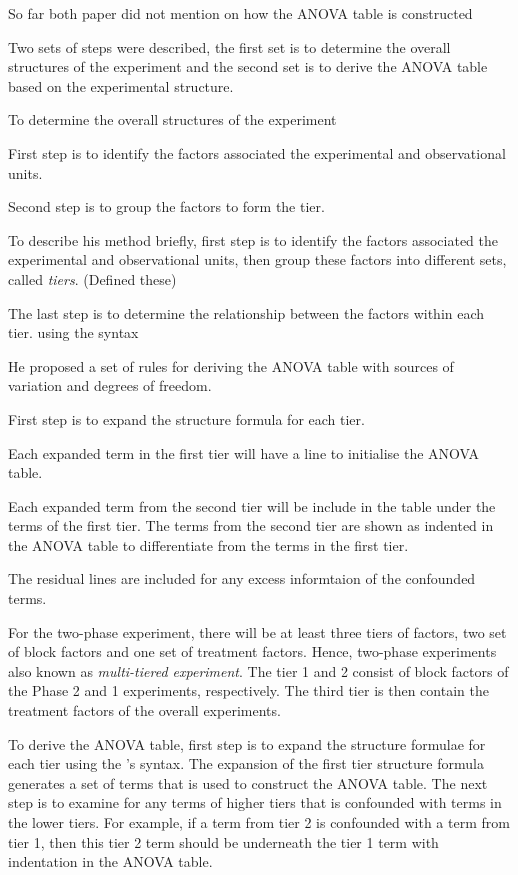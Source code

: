 \documentclass[11pt,a4paper]{article}
\begin{document}
So far both paper did not mention on how the ANOVA table is constructed 


Two sets of steps were described, the first set is to determine the overall structures of the experiment and the second set is to derive the ANOVA table based on the experimental structure.

To determine the overall structures of the experiment

First step is to identify the factors associated the experimental and observational units.

Second step is to group the factors to form the tier. 


To describe his method briefly, first step is to identify the factors associated the experimental and observational units, then group these factors into different sets, called \emph{tiers}. (Defined these)


The last step is to determine the relationship between the factors within each tier. using the syntax



He proposed a set of rules for deriving the ANOVA table with sources of variation and degrees of freedom.

First step is to expand the structure formula for each tier.

Each expanded term in the first tier will have a line to initialise the ANOVA table.

Each expanded term from the second tier will be include in the table under the terms of the first tier. The terms from the second tier are shown as indented in the ANOVA table to differentiate from the terms in the first tier. 

The residual lines are included for any excess informtaion of the confounded terms. 
















For the two-phase experiment, there will be at least three tiers of factors, two set of block factors and one set of treatment factors. Hence, two-phase experiments also known as \emph{multi-tiered experiment}. The tier 1 and 2 consist of block factors of the Phase 2 and 1 experiments, respectively. The third tier is then contain the treatment factors of the overall experiments.  

To derive the ANOVA table, first step is to expand the structure formulae for each tier using the \citeauthor{Wilkinson1973}'s syntax. The expansion of the first tier structure formula generates a set of terms that is used to construct the ANOVA table. The next step is to examine for any terms of higher tiers that is confounded with terms in the lower tiers. For example, if a term from tier 2 is confounded with a term from tier 1, then this tier 2 term should be underneath the tier 1 term with indentation in the ANOVA table. 
\end{document}
